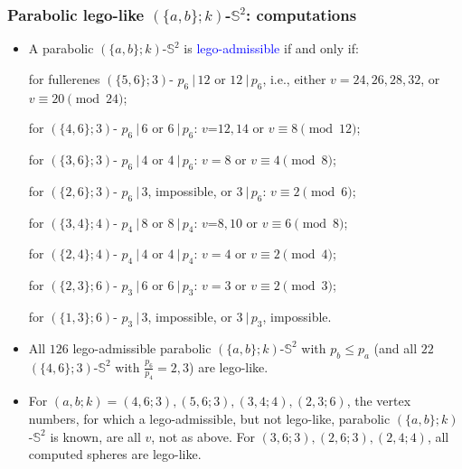 \documentclass{beamer}
\begin{document}
\begin{frame}\frametitle{Parabolic lego-like   $(\{a,b\}; k)$-$\mathbb{S}^2$: computations}
\vspace{-4mm}
\begin{itemize}
\item A parabolic $(\{a,b\};k)$-$\mathbb{S}^2$ is  \textcolor{blue}{lego-admissible} if and only if:
 
for fullerenes $(\{5,6\};3)$- $p_6\ |\, 12$ or $12\ |\, p_6$, i.e., either
                      $v=24,26,28,32$, or $v\equiv20 \pmod {24}$;

for $(\{4,6\};3)$- $p_6 \ |\, 6$ or $6\ |\, p_6$:
                      $v$=$12, 14$  or $v\equiv 8 \pmod {12}$;

 for $(\{3,6\};3)$- $p_6\ |\, 4$ or $4\ |\, p_6$:
                      $v=8$  or $v\equiv 4 \pmod 8$;
 
 
 for $(\{2,6\};3)$- $p_6\ |\, 3$, impossible, or $3\ |\, p_6$:
                         $v\equiv 2 \pmod 6$;
 
 
 for $(\{3,4\};4)$- $p_4\ |\,8$ or $8\ |\, p_4$:
                      $v$=$8, 10$  or $v\equiv 6 \pmod 8$;

for  $(\{2,4\};4)$- $p_4\ |\,4$ or $4\ |\, p_4$:
                      $v=4$  or $v\equiv 2 \pmod 4$;

 for  $(\{2,3\};6)$- $p_3\ |\,6$ or $6\ |\,p_3$:
                      $v=3$  or $v\equiv 2 \pmod 3$;

  for $(\{1,3\};6)$- $p_3\ |\,3$, impossible,  or $3\ |\,p_3$,  
  impossible.







\item  
 All $126$ lego-admissible  parabolic $(\{a,b\};k)$-$\mathbb{S}^2$ with $p_b\le p_a$ 
(and all $22$ $(\{4,6\};3)$-$\mathbb{S}^2$ with $\frac{p_6}{p_4}=2,3$) are lego-like.
\item
For $(a,b;k)=(4,6;3),(5,6;3),(3,4;4),(2,3;6)$,
 the vertex numbers, for which a lego-admissible, but not lego-like, parabolic $(\{a,b\};k)$-$\mathbb{S}^2$ is known, are all $v$, not 
 as 
  above.
For 
 $(3,6;3),(2,6;3),(2,4;4)$, all computed 
 spheres 
are lego-like.

\end{itemize}
\end{frame}
\end{document}
